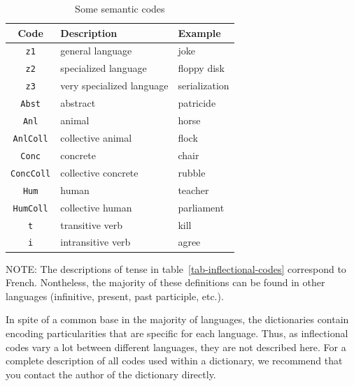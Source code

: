 \begin{table}[!h]
\begin{center}
\begin{tabular}{|c|l|l|}
\hline
\textbf{Code} & \textbf{Description} & \textbf{Example} \\
\hline
\verb+z1+ & general language & joke \\
\hline
\verb+z2+ & specialized language & floppy disk \\
\hline
\verb+z3+ & very specialized language & serialization \\
\hline
\verb+Abst+ & abstract & patricide \\
\hline
\verb+Anl+ & animal & horse \\
\hline
\verb+AnlColl+ & collective animal & flock \\
\hline
\verb+Conc+ & concrete & chair \\
\hline
\verb+ConcColl+ & collective concrete & rubble \\
\hline
\verb+Hum+ & human & teacher \\
\hline
\verb+HumColl+ & collective human & parliament \\
\hline
\verb+t+ & transitive verb & kill \\
\hline
\verb+i+ & intransitive verb & agree \\
\hline
\end{tabular}
\caption{Some semantic codes\label{tab-semantic-codes}}
\end{center}
\end{table}

\bigskip
\noindent NOTE: The  descriptions of tense in
table~\ref{tab-inflectional-codes} correspond to French.
Nontheless, the majority of these definitions can be found in other languages (infinitive, present, past participle, etc.).

\bigskip
\noindent In spite of a common base in the majority of languages, the dictionaries
contain encoding particularities that are specific for each language. Thus, as
inflectional codes vary a lot between different languages, they are not
described here. For a complete description of all codes used within a dictionary,
we recommend that you  contact the author of the dictionary directly.

